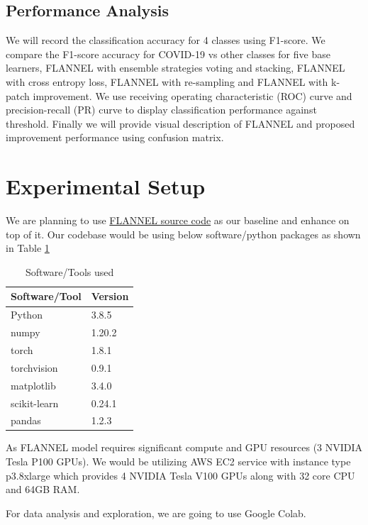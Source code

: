 \documentclass{sigkddExp}
\begin{document}
\subsection{Performance Analysis}
We will record the classification accuracy for 4 classes using F1-score. We
compare the F1-score accuracy for COVID-19 vs other classes for five base
learners, FLANNEL with ensemble strategies voting and stacking, FLANNEL with
cross entropy loss, FLANNEL with re-sampling and FLANNEL with k-patch
improvement. We use receiving operating characteristic (ROC) curve and
precision-recall (PR) curve to display classification performance against
threshold. Finally we will provide visual description of FLANNEL and proposed
improvement performance using confusion matrix.

\section{Experimental Setup}
We are planning to use \href{https://github.com/qxiaobu/FLANNEL} {FLANNEL source
    code}  as our baseline and enhance on top of it. Our codebase would be using
    below software/python packages as shown in Table \ref{table:package}
\begin{table}[h]
    \centering
    \caption{Software/Tools used}
    \label{table:package}
    \begin{tabular}{|l|l|} \hline
        Software/Tool & Version \\ \hline
        Python        & 3.8.5   \\ \hline
        numpy         & 1.20.2  \\ \hline
        torch         & 1.8.1   \\ \hline
        torchvision   & 0.9.1   \\ \hline
        matplotlib    & 3.4.0   \\ \hline
        scikit-learn  & 0.24.1  \\ \hline
        pandas        & 1.2.3   \\
        \hline\end{tabular}
\end{table}

As FLANNEL model requires significant compute and GPU resources (3 NVIDIA Tesla
P100 GPUs). We would be utilizing AWS EC2 service with instance type p3.8xlarge
which provides 4 NVIDIA Tesla V100 GPUs along with 32 core CPU and 64GB RAM.

For data analysis and exploration, we are going to use Google Colab.
\end{document}
